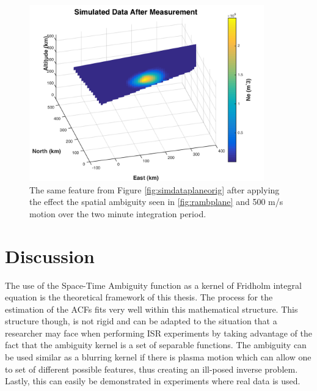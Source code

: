 \begin{figure}[h!]
	\centering
	\includegraphics[width=4in]{simdataplane}
	\caption{The same feature from Figure \ref{fig:simdataplaneorig} after applying the effect the spatial ambiguity seen in \ref{fig:rambplane} and 500 m/s motion over the two minute integration period.}
	\label{fig:simdataplane}
\end{figure}

\section{Discussion}

The use of the Space-Time Ambiguity function as a kernel of Fridholm integral equation is the theoretical framework of this thesis. The process for the estimation of the ACFs fits very well within this mathematical structure. This structure though, is not rigid and can be adapted to the situation that a researcher may face when performing ISR experiments by taking advantage of the fact that the ambiguity kernel is a set of separable functions. The ambiguity can be used similar as a blurring kernel if there is plasma motion which can allow one to set of different possible features, thus creating an ill-posed inverse problem. Lastly, this can easily be demonstrated in experiments where real data is used.